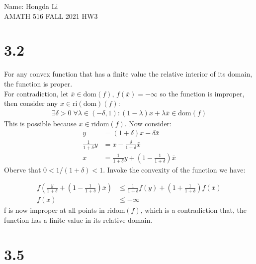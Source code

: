 \documentclass[]{article}
\begin{document}
\begin{center}
    Name: Hongda Li
    \\
    AMATH 516 FALL 2021 HW3
\end{center}
\section*{3.2}
    For any convex function that has a finite value the relative interior of its domain, the function is proper. 
    \\[1.1em]
    For contradiction, let $\bar{x} \in \text{dom}(f)$, $f(\bar{x}) = -\infty$ so the function is improper, then consider any $x\in \text{ri}(\text{dom})(f)$: 
    \begin{align*}\tag{3.2.1}\label{eqn:3.2.1}
        \exists \delta > 0 \; \forall \lambda \in (-\delta, 1): (1 - \lambda)x + \lambda \bar{x} \in \text{dom}(f)
    \end{align*}
    This is possible because $x\in \text{ri}\text{dom}(f)$. Now consider: 
    \begin{align*}\tag{3.2.2}\label{eqn:3.2.2}
        y &= (1 + \delta)x - \delta \bar{x}
        \\
        \frac{1}{1 + \delta} y &= x - \frac{\delta}{1 + \delta }\bar{x}
        \\
        x &= \frac{1}{1 + \delta} y + \left(1 - 
            \frac{1}{1 + \delta}
        \right)\bar{x}
    \end{align*}
    Oberve that $0<1/ (1 + \delta) < 1$. Invoke the convexity of the function we have: 

    \begin{align*}\tag{3.2.3}\label{eqn:3.2.3}
        f\left(
            \frac{y}{1 + \delta} + \left(
                1 - \frac{1}{1 + \delta}
            \right)\bar{x}
        \right) &\le \frac{1}{1 + \delta}f(y) + \left(
            1 + \frac{1}{1 + \delta}
        \right)f(\bar{x})
        \\
        f(x) &\le - \infty
    \end{align*}
    f is now improper at all points in $\text{ri}\text{dom}(f)$, which is a contradiction that, the function has a finite value in its relative domain. 

\section*{3.5}
\end{document}
